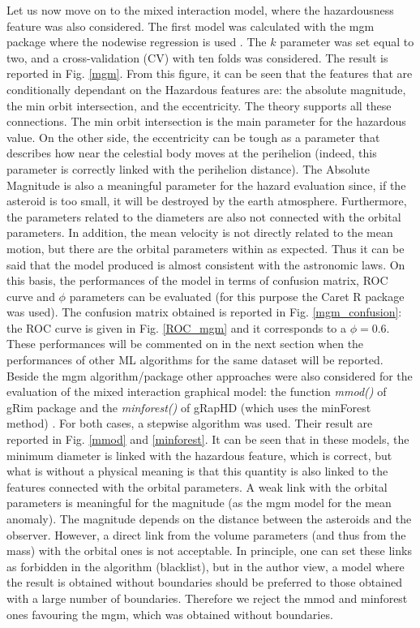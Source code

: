 \documentclass[12pt,%
               a4paper,%
               oneside,openany,%
               titlepage,%
               headinclude,footinclude,%
               BCOR5mm,%
               cleardoublepage=empty,%
               tablecaptionabove,%
               floatperchapter,
               ]{scrreprt}                 %
\begin{document}
Let us now move on to the mixed interaction model, where the hazardousness feature was also considered.  The first model was calculated with the mgm package  \cite{mgm,haslbeck2015mgm} where the nodewise regression is used \cite{meinshausen2006high}. The $k$ parameter was set equal to two, and a cross-validation (CV) with ten folds was considered. The result is reported in Fig. \ref{mgm}. From this figure, it can be seen that the features that are conditionally dependant on the Hazardous features are: the absolute magnitude, the min orbit intersection, and the eccentricity.  The theory supports all these connections. The min orbit intersection is the main parameter for the hazardous value. On the other side, the eccentricity can be tough as a parameter that describes how near the celestial body moves at the perihelion (indeed, this parameter is correctly linked with the perihelion distance). The Absolute Magnitude is also a meaningful parameter for the hazard evaluation since, if the asteroid is too small, it will be destroyed by the earth atmosphere.  Furthermore, the parameters related to the diameters are also not connected with the orbital parameters. In addition, the mean velocity is not directly related to the mean motion, but there are the orbital parameters within as expected. Thus it can be said that the model produced is almost consistent with the astronomic laws. On this basis, the performances of the model in terms of confusion matrix, ROC curve and $\phi$ parameters can be evaluated (for this purpose the Caret R package \cite{kuhn2008building,caret} was used). The confusion matrix obtained is reported in Fig. \ref{mgm_confusion}: the ROC curve is given in Fig. \ref{ROC_mgm} and it corresponds to a $\phi=0.6$. These performances will be commented on in the next section when the performances of other ML algorithms for the same dataset will be reported. Beside the mgm algorithm/package other approaches were also considered for the evaluation of the mixed interaction graphical model: the function \textit{mmod()} of gRim package \cite{hojsgaard2012graphical} and the \textit{minforest()} of gRapHD (which uses the minForest method) \cite{de2009high}. For both cases, a stepwise algorithm was used.  Their result are reported in Fig. \ref{mmod} and \ref{minforest}. It can be seen that in these models, the minimum diameter is linked with the hazardous feature, which is correct, but what is without a physical meaning is that this quantity is also linked to the features connected with the orbital parameters. A weak link with the orbital parameters is meaningful for the magnitude (as the mgm model for the mean anomaly).  The magnitude depends on the distance between the asteroids and the observer.   However, a direct link from the volume parameters (and thus from the mass) with the orbital ones is not acceptable. In principle, one can set these links as forbidden in the algorithm (blacklist), but in the author view, a model where the result is obtained without boundaries should be preferred to those obtained with a large number of boundaries. Therefore we reject the mmod and minforest ones favouring the mgm, which was obtained without boundaries. 
\end{document}
